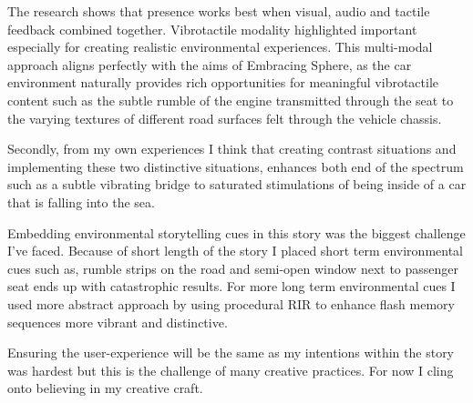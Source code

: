         The research shows that presence works best when visual, audio and tactile feedback combined together. Vibrotactile modality highlighted important especially for creating realistic environmental experiences. This multi-modal approach aligns perfectly with the aims of Embracing Sphere, as the car environment naturally provides rich opportunities for meaningful vibrotactile content such as the subtle rumble of the engine transmitted through the seat to the varying textures of different road surfaces felt through the vehicle chassis.\par

        Secondly, from my own experiences I think that creating contrast situations and implementing these two distinctive situations, enhances both end of the spectrum such as a subtle vibrating bridge to saturated stimulations of being inside of a car that is falling into the sea.\par

        Embedding environmental storytelling cues in this story was the biggest challenge I've faced. Because of short length of the story I placed short term environmental cues such as, rumble strips on the road and semi-open window next to passenger seat ends up with catastrophic results. For more long term environmental cues I used more abstract approach by using procedural RIR to enhance flash memory sequences more vibrant and distinctive.\par

        Ensuring the user-experience will be the same as my intentions within the story was hardest but this is the challenge of many creative practices. For now I cling onto believing in my creative craft.\par